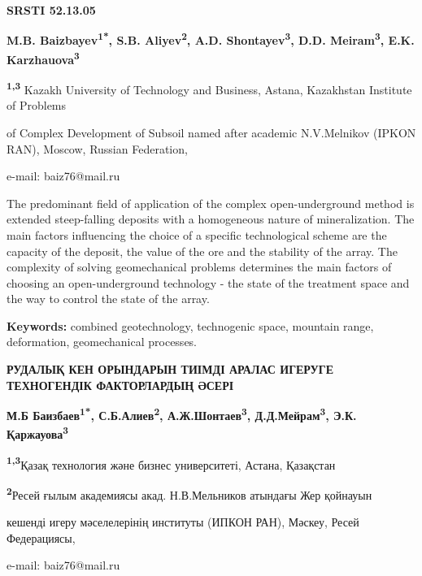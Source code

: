 \clearpage
{\bfseries SRSTI 52.13.05}


\begin{center}
{\bfseries M.B. Baizbayev\textsuperscript{1*}, S.B.
Aliyev\textsuperscript{2}, A.D. Shontayev\textsuperscript{3}, D.D.
Meiram\textsuperscript{3}, E.K. Karzhauova\textsuperscript{3}}

{\bfseries \textsuperscript{1,3}} Kazakh University of Technology and
Business, Astana, Kazakhstan Institute of Problems

of Complex Development of Subsoil named after academic N.V.Melnikov
(IPKON RAN), Moscow, Russian Federation,

e-mail: baiz76@mail.ru
\end{center}

The predominant field of application of the complex open-underground
method is extended steep-falling deposits with a homogeneous nature of
mineralization. The main factors influencing the choice of a specific
technological scheme are the capacity of the deposit, the value of the
ore and the stability of the array. The complexity of solving
geomechanical problems determines the main factors of choosing an
open-underground technology - the state of the treatment space and the
way to control the state of the array.

{\bfseries Keywords:} combined geotechnology, technogenic space, mountain
range, deformation, geomechanical processes.

\begin{center}
{\large\bfseries РУДАЛЫҚ КЕН ОРЫНДАРЫН ТИІМДІ АРАЛАС ИГЕРУГЕ ТЕХНОГЕНДІК ФАКТОРЛАРДЫҢ ӘСЕРІ}

{\bfseries М.Б Баизбаев\textsuperscript{1*}, С.Б.Алиев\textsuperscript{2},
А.Ж.Шонтаев\textsuperscript{3}, Д.Д.Мейрам\textsuperscript{3}, Э.К.
Қаржауова\textsuperscript{3}}

{\bfseries \textsuperscript{1,3}}Қазақ технология және бизнес университеті,
Астана, Қазақстан

{\bfseries \textsuperscript{2}}Ресей ғылым академиясы акад. Н.В.Мельников
атындағы Жер қойнауын

кешенді игеру мәселелерінің институты (ИПКОН РАН), Мәскеу, Ресей
Федерациясы,

e-mail: baiz76@mail.ru
\end{center}

